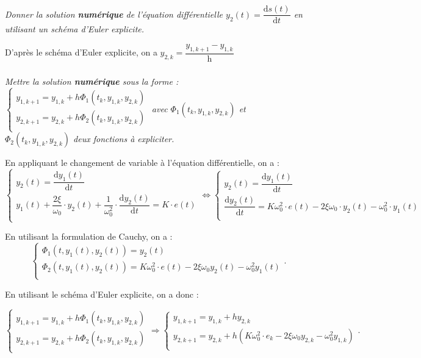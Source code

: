 \documentclass[10pt,fleqn]{article} %
\begin{document}
\subparagraph{}
\textit{Donner la solution \textbf{numérique} de l'équation différentielle $y_2(t)=\dfrac{\text{d}s(t)}{\text{d} t}$ en utilisant un schéma d'Euler explicite.}

\ifprof
\begin{corrige}
D'après le schéma d'Euler explicite, on a $y_{2,k}=\dfrac{y_{1,k+1}-y_{1,k}}{\text{h}}$


\end{corrige}
\else
\fi

\subparagraph{}
\textit{Mettre la solution \textbf{numérique} sous la forme :
$ \left\{ 
\begin{array}{l}
y_{1,k+1}=y_{1,k}+h \Phi_1(t_k,y_{1,k},y_{2,k}) \\
y_{2,k+1}=y_{2,k}+h \Phi_2(t_k,y_{1,k},y_{2,k}) \\
\end{array}
\right.
$ avec $\Phi_1(t_k,y_{1,k},y_{2,k})$ et $\Phi_2(t_k,y_{1,k},y_{2,k})$ deux fonctions à expliciter.}

\ifprof
\begin{corrige}
En appliquant le changement de variable à l'équation différentielle, on a :
$$
\left\{ 
\begin{array}{l}
y_2(t)=\dfrac{\text{d}y_1(t)}{\text{d}t} \\
y_1(t)
+\dfrac{2\xi}{\omega_0}\cdot y_2(t)
+\dfrac{1}{\omega_0^2}\cdot \dfrac{\text{d}y_2(t)}{\text{d}t}
= K\cdot e(t) \\
\end{array}
\right.
\Leftrightarrow 
\left\{ 
\begin{array}{l}
y_2(t)=\dfrac{\text{d}y_1(t)}{\text{d}t} \\
\dfrac{\text{d}y_2(t)}{\text{d}t}
= K\omega_0^2\cdot e(t)-{2\xi\omega_0}\cdot y_2(t)-\omega_0^2\cdot y_1(t)
\\
\end{array}
\right.
$$

En utilisant la formulation de Cauchy, on a :
$$
\left\{ 
\begin{array}{l}
\Phi_1(t,y_1(t),y_2(t))=y_2(t)\\
\Phi_2(t,y_1(t),y_2(t))=K\omega_0^2\cdot e(t) - 2\xi \omega_0  y_2(t) -\omega_0^2y_1(t)\\
\end{array}
\right.
.
$$

En utilisant le schéma d'Euler explicite, on a donc : 

$$
\left\{ 
\begin{array}{l}
y_{1,k+1}=y_{1,k}+h \Phi_1(t_k,y_{1,k},y_{2,k}) \\
y_{2,k+1}=y_{2,k}+h \Phi_2(t_k,y_{1,k},y_{2,k}) \\
\end{array}
\right.
\Rightarrow
\left\{ 
\begin{array}{l}
y_{1,k+1}=y_{1,k}+h y_{2,k} \\
y_{2,k+1}=y_{2,k}+h \left( K\omega_0^2\cdot e_k - 2\xi \omega_0  y_{2,k} -\omega_0^2y_{1,k}\right) \\
\end{array}
\right.
.
$$
\end{corrige}
\else
\fi
\end{document}

